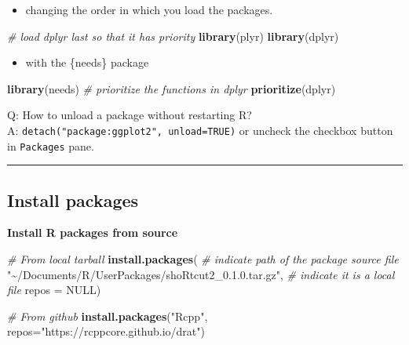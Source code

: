 \documentclass[
]{book}
\newenvironment{Shaded}{\begin{snugshade}}{\end{snugshade}}
\newcommand{\AttributeTok}[1]{\textcolor[rgb]{0.13,0.29,0.53}{#1}}
\newcommand{\CommentTok}[1]{\textcolor[rgb]{0.56,0.35,0.01}{\textit{#1}}}
\newcommand{\ConstantTok}[1]{\textcolor[rgb]{0.56,0.35,0.01}{#1}}
\newcommand{\FunctionTok}[1]{\textcolor[rgb]{0.13,0.29,0.53}{\textbf{#1}}}
\newcommand{\NormalTok}[1]{#1}
\newcommand{\StringTok}[1]{\textcolor[rgb]{0.31,0.60,0.02}{#1}}
\providecommand{\tightlist}{%
  \setlength{\itemsep}{0pt}\setlength{\parskip}{0pt}}
\theoremstyle{definition}
\theoremstyle{definition}
\theoremstyle{definition}
\theoremstyle{definition}
\theoremstyle{remark}
\begin{document}
\begin{itemize}
\tightlist
\item
  changing the order in which you load the packages.
\end{itemize}

\begin{Shaded}
\begin{Highlighting}[]
\CommentTok{\# load dplyr last so that it has priority}
\FunctionTok{library}\NormalTok{(plyr)}
\FunctionTok{library}\NormalTok{(dplyr)}
\end{Highlighting}
\end{Shaded}

\begin{itemize}
\tightlist
\item
  with the \{needs\} package
\end{itemize}

\begin{Shaded}
\begin{Highlighting}[]
\FunctionTok{library}\NormalTok{(needs)}
\CommentTok{\# prioritize the functions in dplyr}
\FunctionTok{prioritize}\NormalTok{(dplyr) }
\end{Highlighting}
\end{Shaded}

Q: How to unload a package without restarting R?\\
A: \texttt{detach("package:ggplot2",\ unload=TRUE)} or uncheck the checkbox button in \texttt{Packages} pane.

\begin{center}\rule{0.5\linewidth}{0.5pt}\end{center}

\subsection{Install packages}\label{install-packages}

\textbf{Install R packages from source}

\begin{Shaded}
\begin{Highlighting}[]
\CommentTok{\# From local tarball}
\FunctionTok{install.packages}\NormalTok{(}
  \CommentTok{\# indicate path of the package source file}
  \StringTok{"\textasciitilde{}/Documents/R/UserPackages/shoRtcut2\_0.1.0.tar.gz"}\NormalTok{, }
  \CommentTok{\# indicate it is a local file}
  \AttributeTok{repos =} \ConstantTok{NULL}\NormalTok{)}

\CommentTok{\# From github}
\FunctionTok{install.packages}\NormalTok{(}\StringTok{"Rcpp"}\NormalTok{, }\AttributeTok{repos=}\StringTok{"https://rcppcore.github.io/drat"}\NormalTok{)}
\end{Highlighting}
\end{Shaded}
\end{document}

